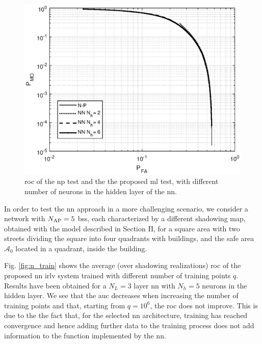 \documentclass[conference,draftcls,onecolumn]{IEEEtran}
\begin{document}
 
 \begin{figure}[h]
     \centering
     \includegraphics[width=0.9\columnwidth]{FA_MD_LOS.eps}
     \caption{\ac{roc} of the \ac{np} test and the the proposed \ac{ml} test,  with different number of neurons in the hidden layer of the \ac{nn}.}
     \label{fig:NP_comp}
 \end{figure}

 
In order to test the \ac{nn} approach in a more challenging scenario, we consider a network with $N_{\rm AP}=5$ \acp{bs}, each  characterized by a different  shadowing map, obtained with the model described in Section II, for a square area with two streets dividing the square into four quadrants with buildings, and the safe area $\mathcal A_0$  located in a quadrant, inside the building.




Fig. \ref{fig:n_train} shows the average (over shadowing realizations) \ac{roc} of the proposed \ac{nn} \ac{irlv} system  trained with different number of training points $q$. Results have been obtained for a $N_L=3$ layer \ac{nn} with $N_h=5$ neurons in the hidden layer. We see that the \ac{auc} decreases when increasing the number of training points and that, starting from $q=10^6$, the \ac{roc} does not improve. This is due to the the fact that, for the selected \ac{nn} architecture, training has reached convergence and hence adding further data to the training process does not add information to the function implemented by the \ac{nn}. 
\end{document}
